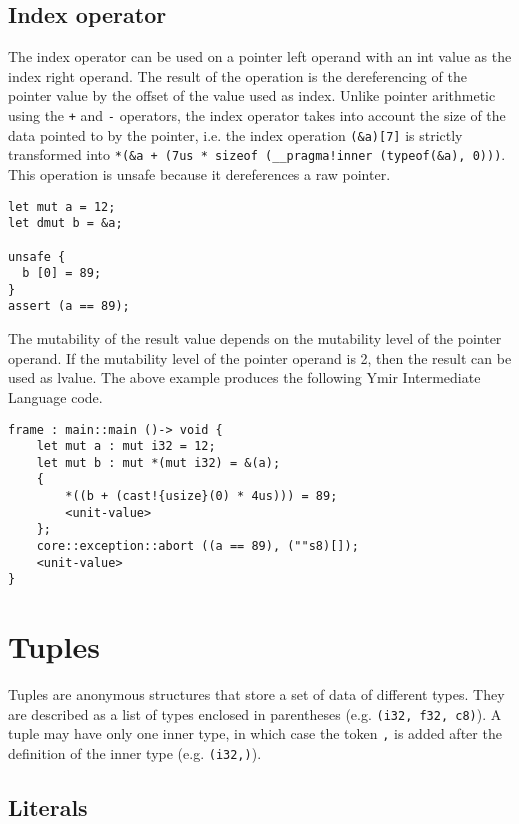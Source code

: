 \subsection {Index operator}

The index operator can be used on a pointer left operand with an int value as
the index right operand. The result of the operation is the dereferencing of the
pointer value by the offset of the value used as index. Unlike pointer
arithmetic using the \texttt{+} and \texttt{-} operators, the index operator
takes into account the size of the data pointed to by the pointer, i.e. the
index operation \texttt{(\&a)[7]} is strictly transformed into \texttt{*(\&a +
  (7us * sizeof (\_\_pragma!inner (typeof(\&a), 0)))}. This operation is unsafe
because it dereferences a raw pointer.

\smallskip

\begin{lstlisting}[style=coloredverbatim]
let mut a = 12;
let dmut b = &a;

unsafe {
  b [0] = 89;
}
assert (a == 89);
\end{lstlisting}

\smallskip

The mutability of the result value depends on the mutability level of the
pointer operand. If the mutability level of the pointer operand is 2, then the
result can be used as lvalue. The above example produces the following Ymir Intermediate Language code.

\begin{lstlisting}[style=intermediateVerb]
frame : main::main ()-> void {
    let mut a : mut i32 = 12;
    let mut b : mut *(mut i32) = &(a);
    {
        *((b + (cast!{usize}(0) * 4us))) = 89;
        <unit-value>
    };
    core::exception::abort ((a == 89), (""s8)[]);
    <unit-value>
}
\end{lstlisting}

\section {Tuples}


Tuples are anonymous structures that store a set of data of different types.
They are described as a list of types enclosed in parentheses (e.g.
\texttt{(i32, f32, c8)}). A tuple may have only one inner type, in which case
the token \texttt{,} is added after the definition of the inner type (e.g.
\texttt{(i32,)}).

\subsection {Literals}

